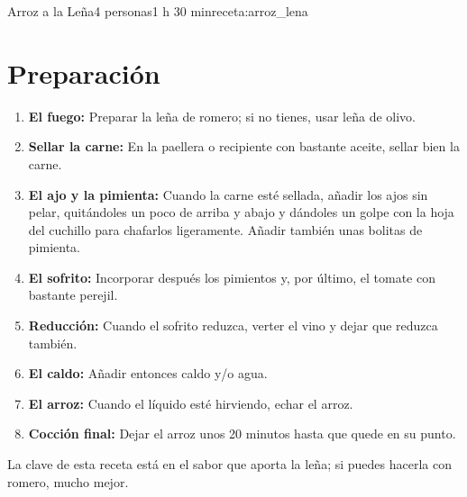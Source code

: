 \begin{recetaConImagen}{Arroz a la Leña}{4 personas}{1 h 30 min}{receta:arroz_lena}
\begin{minipage}[t]{0.6\textwidth}
        \section*{Preparación}
        \begin{enumerate}[itemsep=3pt, topsep=2pt]
            \item \textbf{El fuego:} Preparar la leña de romero; si no tienes, usar leña de olivo.
            \item \textbf{Sellar la carne:} En la paellera o recipiente con bastante aceite, sellar bien la carne.
            \item \textbf{El ajo y la pimienta:} Cuando la carne esté sellada, añadir los ajos sin pelar, quitándoles un poco de arriba y abajo y dándoles un golpe con la hoja del cuchillo para chafarlos ligeramente. Añadir también unas bolitas de pimienta.
            \item \textbf{El sofrito:} Incorporar después los pimientos y, por último, el tomate con bastante perejil.
            \item \textbf{Reducción:} Cuando el sofrito reduzca, verter el vino y dejar que reduzca también.
            \item \textbf{El caldo:} Añadir entonces caldo y/o agua.
            \item \textbf{El arroz:} Cuando el líquido esté hirviendo, echar el arroz.
            \item \textbf{Cocción final:} Dejar el arroz unos 20 minutos hasta que quede en su punto.
        \end{enumerate}
    \end{minipage}

    \vspace{1em}
    \begin{tcolorbox}[colback=orange!5, colframe=orange!50, title=Nota, size=small]
        La clave de esta receta está en el sabor que aporta la leña; si puedes hacerla con romero, mucho mejor.
    \end{tcolorbox}
\end{recetaConImagen}
